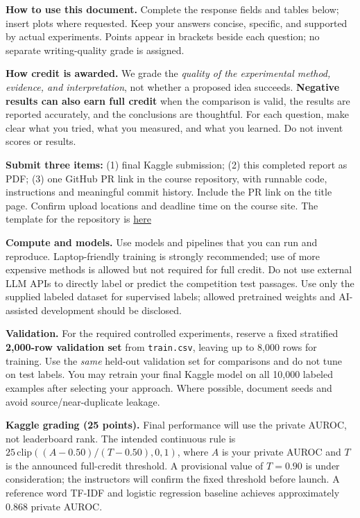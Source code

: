 \documentclass[11pt,letterpaper]{article}
\begin{document}
\textbf{How to use this document.} Complete the response fields and tables below; insert plots where requested. Keep your answers concise, specific, and supported by actual experiments. Points appear in brackets beside each question; no separate writing-quality grade is assigned.

\textbf{How credit is awarded.} We grade the \emph{quality of the experimental method, evidence, and interpretation}, not whether a proposed idea succeeds. \textbf{Negative results can also earn full credit} when the comparison is valid, the results are reported accurately, and the conclusions are thoughtful. For each question, make clear what you tried, what you measured, and what you learned. Do not invent scores or results.

\textbf{Submit three items:} (1) final Kaggle submission; (2) this completed report as PDF; (3) one GitHub PR link in the course repository, with runnable code, instructions and meaningful commit history. Include the PR link on the title page. Confirm upload locations and deadline time on the course site. The template for the repository is \href{https://github.com/sekhari/human-or-ai-submissions}{here}

\textbf{Compute and models.} Use models and pipelines that you can run and reproduce. Laptop-friendly training is strongly recommended; use of more expensive methods is allowed but not required for full credit. Do not use external LLM APIs to directly label or predict the competition test passages. Use only the supplied labeled dataset for supervised labels; allowed pretrained weights and AI-assisted development should be disclosed.

\textbf{Validation.} For the required controlled experiments, reserve a fixed stratified \textbf{2,000-row validation set} from \texttt{train.csv}, leaving up to 8,000 rows for training. Use the \emph{same} held-out validation set for comparisons and do not tune on test labels. You may retrain your final Kaggle model on all 10,000 labeled examples after selecting your approach. Where possible, document seeds and avoid source/near-duplicate leakage.

\textbf{Kaggle grading (25 points).} Final performance will use the private AUROC, not leaderboard rank. The intended continuous rule is $25\,\mathrm{clip}((A-0.50)/(T-0.50),0,1)$, where $A$ is your private AUROC and $T$ is the announced full-credit threshold. A provisional value of $T=0.90$ is under consideration; the instructors will confirm the fixed threshold before launch. A reference word TF-IDF and logistic regression baseline achieves approximately 0.868 private AUROC.
\end{document}
